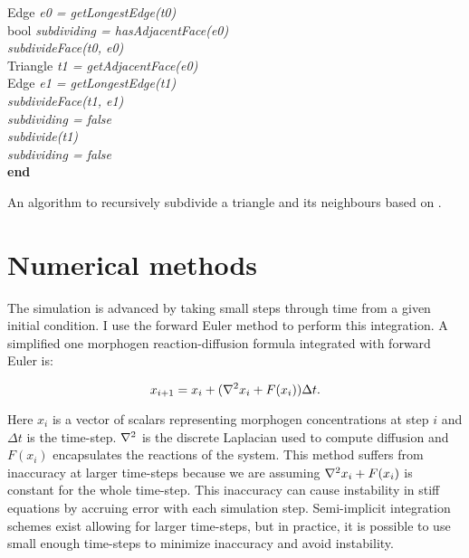 \begin{algorithm}[!ht]
  {
   Edge \textit{e0 = getLongestEdge(t0)}\\
   bool \textit{subdividing = hasAdjacentFace(e0)}\\
   \textit{subdivideFace(t0, e0)}\\
   {
    {
      Triangle \textit{t1 = getAdjacentFace(e0)}\\
      Edge \textit{e1 = getLongestEdge(t1)}\\
      {
       \textit{subdivideFace(t1, e1)}\\
       \textit{subdividing = false}\\
      }{
        \textit{subdivide(t1)}\\   
      }
    }{
     \textit{subdividing = false}\\
    }
   }
  }
  \textbf{end}
  \caption{An algorithm to recursively subdivide a triangle and its neighbours based on \citep{RIVARA1998}.}
  \label{alg:subdivisionAlgorithm}
\end{algorithm}

\section{Numerical methods}
The simulation is advanced by taking small steps through time from a given initial condition. I use the forward Euler method \citep{solomon2015numerical} to perform this integration. A simplified one morphogen reaction-diffusion formula integrated with forward Euler is:

\[
	x_{i+1} = x_{i} + (\nabla^2{}x_i + F(x_i))\Delta t. \\
\] 

Here $x_i$ is a vector of scalars representing morphogen concentrations at step $i$ and $\Delta t$ is the time-step. $\nabla^2{}$ is the discrete Laplacian used to compute diffusion and $F(x_i)$ encapsulates the reactions of the system. This method suffers from inaccuracy at larger time-steps because we are assuming $\nabla^2{}x_i + F(x_i)$ is constant for the whole time-step. This inaccuracy can cause instability in stiff equations by accruing error with each simulation step. Semi-implicit integration schemes exist \citep{Nie2006} allowing for larger time-steps, but in practice, it is possible to use small enough time-steps to minimize inaccuracy and avoid instability. 